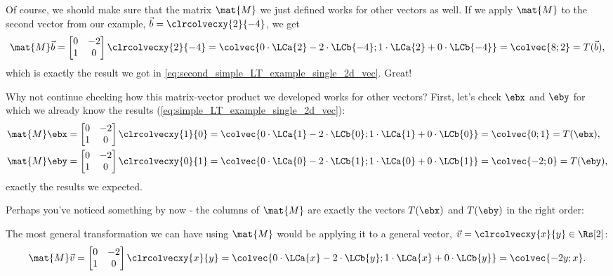 Of course, we should make sure that the matrix $\mat{M}$ we just defined works for other vectors as well. If we apply $\mat{M}$ to the second vector from our example, $\vec{b}=\clrcolvecxy{2}{-4}$, we get
\begin{equation}
	\mat{M}\vec{b} =
	\begin{bmatrix}
		0 & -2 \\
		1 & 0
	\end{bmatrix}\clrcolvecxy{2}{-4} = \colvec{0\cdot\LCa{2}-2\cdot\LCb{-4};1\cdot\LCa{2}+0\cdot\LCb{-4}} = \colvec{8;2} = T(\vec{b}),
	\label{eq:validating matrix works for b}
\end{equation}
which is exactly the result we got in \autoref{eq:second_simple_LT_example_single_2d_vec}. Great!

Why not continue checking how this matrix-vector product we developed works for other vectors? First, let's check $\ebx$ and $\eby$ for which we already know the results (\autoref{eq:simple_LT_example_single_2d_vec}):
\begin{equation}
	\begin{aligned}
		\mat{M}\ebx & =
		\begin{bmatrix}
			0 & -2 \\
			1 & 0
		\end{bmatrix}\clrcolvecxy{1}{0} = \colvec{0\cdot\LCa{1}-2\cdot\LCb{0};1\cdot\LCa{1}+0\cdot\LCb{0}} = \colvec{0;1} = T(\ebx), \\
		\mat{M}\eby & =
		\begin{bmatrix}
			0 & -2 \\
			1 & 0
		\end{bmatrix}\clrcolvecxy{0}{1} = \colvec{0\cdot\LCa{0}-2\cdot\LCb{1};1\cdot\LCa{0}+0\cdot\LCb{1}} = \colvec{-2;0} = T(\eby),
		\label{eq:}
	\end{aligned}
\end{equation}
exactly the results we expected.

Perhaps you've noticed something by now - the columns of $\mat{M}$ are exactly the vectors $T(\ebx)$ and $T(\eby)$ in the right order:

\begin{center}
\end{center}

The most general transformation we can have using $\mat{M}$ would be applying it to a general vector, $\vec{v}=\clrcolvecxy{x}{y}\in\Rs[2]$:
\begin{equation}
	\mat{M}\vec{v} = \begin{bmatrix}
		0 & -2 \\
		1 & 0
	\end{bmatrix}\clrcolvecxy{x}{y} = \colvec{0\cdot\LCa{x}-2\cdot\LCb{y};1\cdot\LCa{x}+0\cdot\LCb{y}} = \colvec{-2y;x}.
	\label{eq:applying M on a generic 2D vector}
\end{equation}

